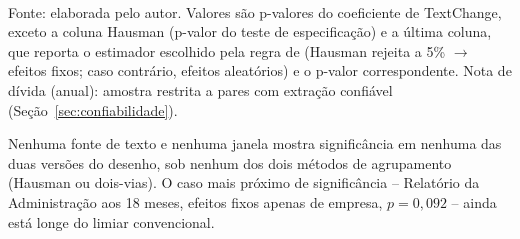 \documentclass[a4paper,12pt]{report}
\begin{document}
\begin{table}[htbp]
    \centering
    \caption{Retorno anormal sob o desenho metodológico de Santos e Coelho (2018)}
    \label{tab:santoscoelho}
    \small
    \\[0.3cm]
    {\footnotesize Fonte: elaborada pelo autor. Valores são p-valores do coeficiente de TextChange, exceto a coluna Hausman (p-valor do teste de especificação) e a última coluna, que reporta o estimador escolhido pela regra de  (Hausman rejeita a 5\% $\rightarrow$ efeitos fixos; caso contrário, efeitos aleatórios) e o p-valor correspondente. Nota de dívida (anual): amostra restrita a pares com extração confiável (Seção~\ref{sec:confiabilidade}).}
\end{table}

Nenhuma fonte de texto e nenhuma janela mostra significância em nenhuma das duas versões do desenho, sob nenhum dos dois métodos de agrupamento (Hausman ou dois-vias). O caso mais próximo de significância -- Relatório da Administração aos 18 meses, efeitos fixos apenas de empresa, $p=0{,}092$ -- ainda está longe do limiar convencional.
\end{document}

